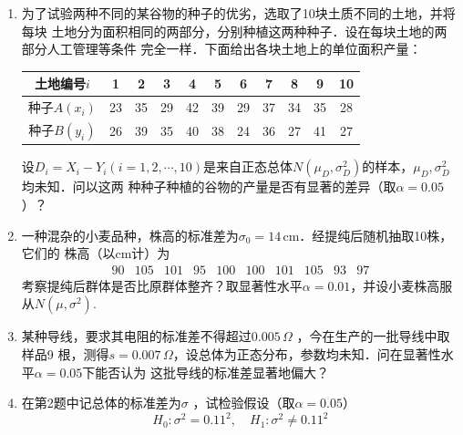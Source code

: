 \begin{enumerate}
    \item 为了试验两种不同的某谷物的种子的优劣，选取了10块土质不同的土地，并将每块
    土地分为面积相同的两部分，分别种植这两种种子．设在每块土地的两部分人工管理等条件
    完全一样．下面给出各块土地上的单位面积产量：
    \renewcommand{\arraystretch}{1.3}
    \begin{table}[H]\centering
        \begin{tabular}{c|cccccccccc}
        \hline
        土地编号$i$    & 1  & 2  & 3  & 4  & 5  & 6  & 7  & 8  & 9  & 10 \\ \hline
        种子$A(x_i)$ & 23 & 35 & 29 & 42 & 39 & 29 & 37 & 34 & 35 & 28 \\ \hline
        种子$B(y_i)$ & 26 & 39 & 35 & 40 & 38 & 24 & 36 & 27 & 41 & 27 \\ \hline
        \end{tabular}
    \end{table}
    \renewcommand{\arraystretch}{1.0}
    设$D_i=X_i-Y_i(i=1,2,\cdots,10)$是来自正态总体$N(\mu_D,\sigma^2_D)$的样本，$\mu_D,\sigma^2_D$均未知．问以这两
    种种子种植的谷物的产量是否有显著的差异（取$\alpha=0.05$）？




    \item 一种混杂的小麦品种，株高的标准差为$\sigma_0=14\, \mathrm{cm}$．经提纯后随机抽取10株，它们的
    株高（以cm计）为
    $$\begin{array}{cccccccccc}
        90 & 105 & 101 & 95  & 100 & 100 & 101 & 105 &  93 & 97
    \end{array}$$
    考察提纯后群体是否比原群体整齐？取显著性水平$\alpha=0.01$，并设小麦株高服从$N(\mu,\sigma^2)$.




    \item 某种导线，要求其电阻的标准差不得超过$0.005\, \Omega$ ，今在生产的一批导线中取样品9
    根，测得$s=0.007\, \Omega$，设总体为正态分布，参数均未知．问在显著性水平$\alpha=0.05$下能否认为
    这批导线的标准差显著地偏大？



    \item 在第2题中记总体的标准差为$\sigma$ ，试检验假设（取$\alpha=0.05$）
    $$H_0:\sigma^2=0.11^2,\quad H_1:\sigma^2\neq 0.11^2$$


\end{enumerate}
